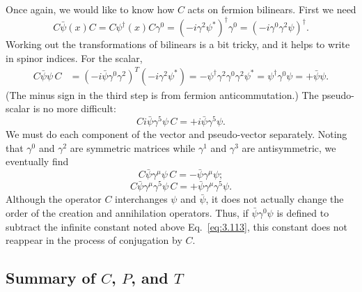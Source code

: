 Once again, we would like to know how $C$ acts on fermion bilinears.  First
we need
\begin{equation}
  C\bar{\psi}(x)C = C\psi^{\dagger}(x)C\gamma^0
    = (-i\gamma^2\psi^{*})^{\dagger}\gamma^0
    = (-i\gamma^0\gamma^2\psi)^{\dagger} .
  \label{eq:3.137}
\end{equation}
Working out the transformations of bilinears is a bit tricky, and it helps to
write in spinor indices.  For the scalar,
\begin{align}
  C\bar{\psi}\psi\,C &= (-i\bar{\psi}\gamma^0\gamma^2)^T(-i\gamma^2\psi^{*})
    = -\psi^{\dagger}\gamma^2\gamma^0\gamma^2\psi^{*}
    = \psi^{\dagger}\gamma^0\psi
    = +\bar{\psi}\psi .
  \label{eq:3.138}
\end{align}
(The minus sign in the third step is from fermion anticommutation.)  The
pseudo-scalar is no more difficult:
\begin{equation}
  Ci\bar{\psi}\gamma^5\psi\,C = +i\bar{\psi}\gamma^5\psi .
  \label{eq:3.139}
\end{equation}
We must do each component of the vector and pseudo-vector separately.  Noting
that $\gamma^0$ and $\gamma^2$ are symmetric matrices while $\gamma^1$ and
$\gamma^3$ are antisymmetric, we eventually find
\begin{equation}
  C\bar{\psi}\gamma^\mu\psi\,C = -\bar{\psi}\gamma^\mu\psi;
  \label{eq:3.140}
\end{equation}
\begin{equation}
  C\bar{\psi}\gamma^\mu\gamma^5\psi\,C = +\bar{\psi}\gamma^\mu\gamma^5\psi .
  \label{eq:3.141}
\end{equation}
Although the operator $C$ interchanges $\psi$ and $\bar{\psi}$, it does not
actually change the order of the creation and annihilation operators.  Thus,
if $\bar{\psi}\gamma^0\psi$ is defined to subtract the infinite constant
noted above Eq.~\eqref{eq:3.113}, this constant does not reappear in the
process of conjugation by $C$.

\subsection{Summary of $C$, $P$, and $T$}

